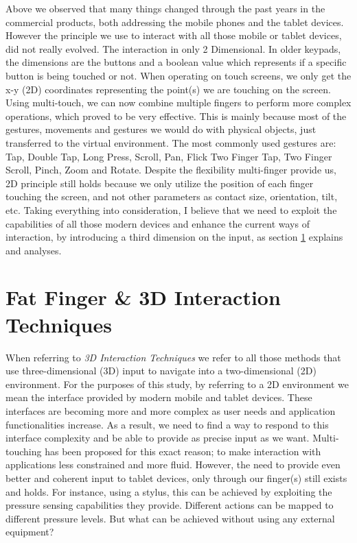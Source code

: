 Above we observed that many things changed through the past years in the commercial products, both addressing the mobile phones and the tablet devices. However  the principle we use to interact with all those mobile or tablet devices, did not really evolved.
 The interaction in only 2 Dimensional. In older keypads, the dimensions are the buttons and a boolean value which represents if a specific button is being touched or not.  
When operating on touch screens, we only get the x-y (2D) coordinates representing the point(s) we are touching on the screen.
Using multi-touch, we can now combine multiple fingers to perform more complex operations, which proved to be very effective. This is mainly because most of the gestures, movements and gestures we would do with physical objects, just transferred to the virtual environment. The most commonly used gestures are: Tap, Double Tap, Long Press, Scroll, Pan, Flick Two Finger Tap, Two Finger Scroll,  Pinch, Zoom and Rotate.
Despite the flexibility multi-finger provide us, 2D principle still holds because we only utilize the position of each finger touching the screen, and not other parameters as contact size, orientation, tilt, etc. Taking everything into consideration, I believe that we need to exploit the capabilities of all those modern devices and enhance the current ways of interaction, by introducing a third dimension on the input, as section \ref{sec:3dInteraction} explains and analyses.

\section{Fat Finger \& 3D Interaction Techniques}
\label{sec:3dInteraction}

When referring to \emph{3D Interaction Techniques} we refer to all those methods that use three-dimensional (3D) input to navigate into a two-dimensional (2D) environment. For the purposes of this study, by referring to a 2D environment we mean the interface provided by modern mobile and tablet devices. These interfaces are becoming more and more complex as user needs and application functionalities increase. As a result, we need to find a way to respond to this interface complexity and be able to provide as precise input as we want. Multi-touching has been proposed for this exact reason; to make interaction with applications less constrained and more fluid. 
However, the need to provide even better and coherent input to tablet devices, only through our finger(s) still exists and holds. For instance, using a stylus, this can be achieved by exploiting the pressure sensing capabilities they provide. Different actions can be mapped to different pressure levels. But what can be achieved without using any external equipment?

